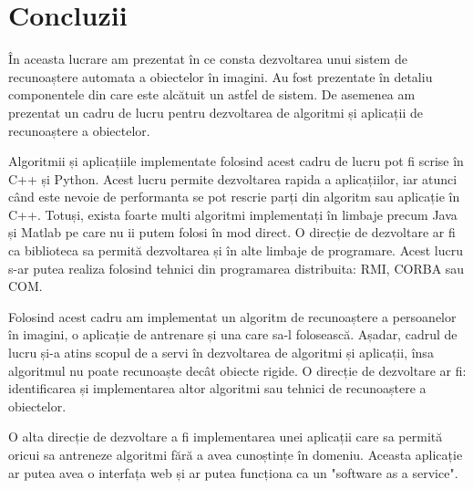 \chapter{Concluzii}

În aceasta lucrare am prezentat în ce consta dezvoltarea unui sistem de recunoaștere automata a obiectelor în imagini. Au fost prezentate în detaliu componentele din care este alcătuit un astfel de sistem. De asemenea am prezentat un cadru de lucru pentru dezvoltarea de algoritmi și aplicații de recunoaștere a obiectelor.

Algoritmii și aplicațiile implementate folosind acest cadru de lucru pot fi scrise în C++ și Python.
Acest lucru permite dezvoltarea rapida a aplicațiilor, iar atunci când este nevoie de performanta se pot rescrie parți din algoritm sau aplicație în C++.
Totuși, exista foarte multi algoritmi implementați în limbaje precum Java și Matlab pe care nu ii putem folosi în mod direct.
O direcție de dezvoltare ar fi ca biblioteca sa permită dezvoltarea și în alte limbaje de programare. Acest lucru s-ar putea realiza folosind tehnici din programarea distribuita: RMI, CORBA sau COM.

Folosind acest cadru am implementat un algoritm de recunoaștere a persoanelor în imagini, o aplicație de antrenare și una care sa-l folosească.
Așadar, cadrul de lucru și-a atins scopul de a servi în dezvoltarea de algoritmi și aplicații, însa algoritmul nu poate recunoaște decât obiecte rigide.
O direcție de dezvoltare ar fi: identificarea și implementarea altor algoritmi sau tehnici de recunoaștere a obiectelor.

O alta direcție de dezvoltare a fi implementarea unei aplicații care sa permită oricui sa antreneze algoritmi fără a avea cunoștințe în domeniu. Aceasta aplicație ar putea avea o interfața web și ar putea funcționa ca un "software as a service".




